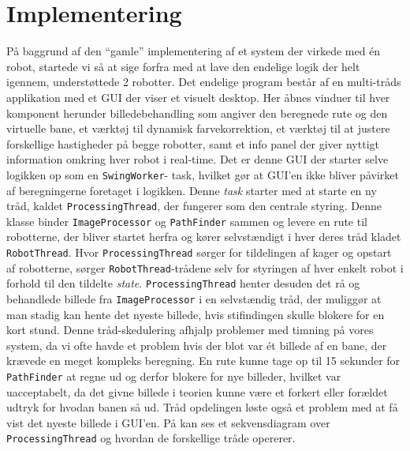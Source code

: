 \section{Implementering}
På baggrund af den "`gamle"' implementering af et system der virkede med én robot, startede vi så at sige forfra med at lave den endelige logik der helt igennem, understøttede 2 robotter.
Det endelige program består af en multi-tråds applikation med et GUI der viser et visuelt desktop. Her åbnes vinduer til hver komponent herunder billedebehandling som angiver den beregnede rute og den virtuelle bane, et værktøj til dynamisk farvekorrektion, et værktøj til at justere forskellige hastigheder på begge robotter, samt et info panel der giver nyttigt information omkring hver robot i real-time.
Det er denne GUI der starter selve logikken op som en \texttt{SwingWorker}- task, hvilket gør at GUI’en ikke bliver påvirket af beregningerne foretaget i logikken. Denne \textit{task} starter med at starte en ny tråd, kaldet \texttt{ProcessingThread}, der fungerer som den centrale styring. Denne klasse binder \texttt{ImageProcessor} og \texttt{PathFinder} sammen og levere en rute til robotterne, der bliver startet herfra og kører selvstændigt i hver deres tråd kladet \texttt{RobotThread}.
Hvor \texttt{ProcessingThread} sørger for tildelingen af kager og opstart af robotterne, sørger \texttt{RobotThread}-trådene selv for styringen af hver enkelt robot i forhold til den tildelte \textit{state}. \texttt{ProcessingThread} henter desuden det rå og behandlede billede fra \texttt{ImageProcessor} i en selvstændig tråd, der muliggør at man stadig kan hente det nyeste billede, hvis stifindingen skulle blokere for en kort stund. Denne tråd-skedulering afhjalp problemer med timning på vores system, da vi ofte havde et problem hvis der blot var ét billede af en bane, der krævede en meget kompleks beregning. En rute kunne tage op til 15 sekunder for \texttt{PathFinder} at regne ud og derfor blokere for nye billeder, hvilket var uacceptabelt, da det givne billede i teorien kunne være et forkert eller forældet udtryk for hvodan banen så ud. Tråd opdelingen løste også et problem med at få vist det nyeste billede i GUI’en. På  kan ses et sekvensdiagram over \texttt{ProcessingThread} og hvordan de forskellige tråde opererer.

